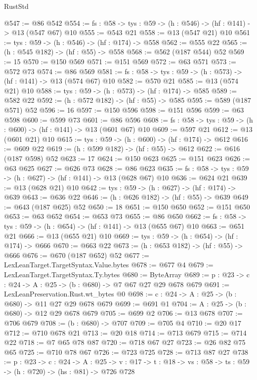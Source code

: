 \begin{lexlean}{RustStd}
\begin{coremodule}
@547 := @86 @542
@554 := {fs : @58} -> {tys : @59} -> (h : @546) -> (hf : @141) -> @13 (@547 @67) @10
@555 := @543 @21
@558 := @13 (@547 @21) @10
@561 := {tys : @59} -> (h : @546) -> (hf : @174) -> @558
@562 := @555 @22
@565 := (h : @545 @182) -> (hf : @55) -> @558
@568 := @562 (@187 @544) @52
@569 := 15
@570 := @150 @569
@571 := @151 @569
@572 := @63 @571
@573 := @572 @73
@574 := @86 @569
@581 := {fs : @58} -> {tys : @59} -> (h : @573) -> (hf : @141) -> @13 (@574 @67) @10
@582 := @570 @21
@585 := @13 (@574 @21) @10
@588 := {tys : @59} -> (h : @573) -> (hf : @174) -> @585
@589 := @582 @22
@592 := (h : @572 @182) -> (hf : @55) -> @585
@595 := @589 (@187 @571) @52
@596 := 16
@597 := @150 @596
@598 := @151 @596
@599 := @63 @598
@600 := @599 @73
@601 := @86 @596
@608 := {fs : @58} -> {tys : @59} -> (h : @600) -> (hf : @141) -> @13 (@601 @67) @10
@609 := @597 @21
@612 := @13 (@601 @21) @10
@615 := {tys : @59} -> (h : @600) -> (hf : @174) -> @612
@616 := @609 @22
@619 := (h : @599 @182) -> (hf : @55) -> @612
@622 := @616 (@187 @598) @52
@623 := 17
@624 := @150 @623
@625 := @151 @623
@626 := @63 @625
@627 := @626 @73
@628 := @86 @623
@635 := {fs : @58} -> {tys : @59} -> (h : @627) -> (hf : @141) -> @13 (@628 @67) @10
@636 := @624 @21
@639 := @13 (@628 @21) @10
@642 := {tys : @59} -> (h : @627) -> (hf : @174) -> @639
@643 := @636 @22
@646 := (h : @626 @182) -> (hf : @55) -> @639
@649 := @643 (@187 @625) @52
@650 := 18
@651 := @150 @650
@652 := @151 @650
@653 := @63 @652
@654 := @653 @73
@655 := @86 @650
@662 := {fs : @58} -> {tys : @59} -> (h : @654) -> (hf : @141) -> @13 (@655 @67) @10
@663 := @651 @21
@666 := @13 (@655 @21) @10
@669 := {tys : @59} -> (h : @654) -> (hf : @174) -> @666
@670 := @663 @22
@673 := (h : @653 @182) -> (hf : @55) -> @666
@676 := @670 (@187 @652) @52
@677 := LexLeanTarget.TargetSyntax.Value.bytes
@678 := @677 @4
@679 := LexLeanTarget.TargetSyntax.Ty.bytes
@680 := ByteArray
@689 := {p : @23} -> {c : @24} -> {A : @25} -> (b : @680) -> @7 @67 @27 @29 @678 @679
@691 := LexLeanPreservation.Rust.wt_bytes @0
@698 := {c : @24} -> {A : @25} -> (b : @680) -> @11 @27 @29 @678 @679
@699 := @691 @1
@704 := {A : @25} -> (b : @680) -> @12 @29 @678 @679
@705 := @699 @2
@706 := @13 @678
@707 := @706 @679
@708 := (b : @680) -> @707
@709 := @705 @4
@710 := @20 @17
@712 := @710 @678 @21
@713 := @20 @18
@714 := @713 @679
@715 := @714 @22
@718 := @7 @65 @78 @87
@720 := @718 @67 @27
@723 := @26 @82 @75 @65
@725 := @710 @78 @67
@726 := @723 @725
@728 := @713 @87 @27
@738 := {p : @23} ->
  {c : @24} ->
  {A : @25} ->
  {v : @17} -> {t : @18} -> {vs : @58} -> {ts : @59} -> (h : @720) -> (hs : @81) -> @726 @728

\end{coremodule}
\end{lexlean}
